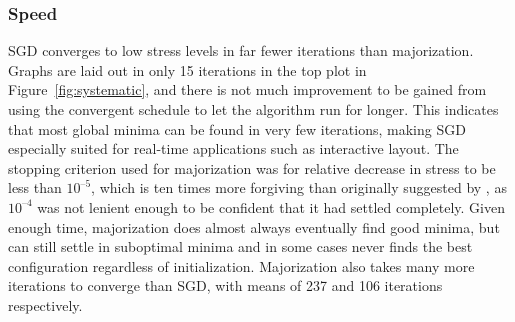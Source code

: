 \subsubsection{Speed}
SGD converges to low stress levels in far fewer iterations than majorization. Graphs are laid out in only 15 iterations in the top plot in Figure~\ref{fig:systematic}, and there is not much improvement to be gained from using the convergent schedule to let the algorithm run for longer. This indicates that most global minima can be found in very few iterations, making SGD especially suited for real-time applications such as interactive layout.
The stopping criterion used for majorization was for relative decrease in stress to be less than $10^{\text{--}5}$, which is ten times more forgiving than originally suggested by \citet{Gansner2004}, as $10^{\text{--}4}$ was not lenient enough to be confident that it had settled completely. Given enough time, majorization does almost always eventually find good minima, but can still settle in suboptimal minima and in some cases never finds the best configuration regardless of initialization.
Majorization also takes many more iterations to converge than SGD, with means of 237 and 106 iterations respectively.

